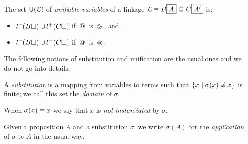 \begin{definition}
\end{definition}


\begin{definition}\label{def:uvars}
  The set $\mathsf{U}(\mathcal{L})$ of {\em unifiable variables} of a linkage
  $\mathcal{L} \equiv B\fbox{$A$}\operatorname{\,@\,} C\fbox{$A'$}$ is:
  \begin{itemize}
  \item $l^-(B\square)\cup l^+(C\square)$ if $\operatorname{\,@\,}$ is $\operatorname{\,\varogreaterthan\,}$, and
  \item $l^-(B\square)\cup l^-(C\square)$ if $\operatorname{\,@\,}$ is $\operatorname{\,\varoast\,}$.
  \end{itemize}
\end{definition}

The following notions of substitution and unification are the usual ones and we
do not go into details:
 
\begin{definition}[Substitution]
  A \emph{substitution} is a mapping from variables to terms such that $\{x ~|~
  \sigma(x)\not\equiv x\}$ is finite; we call this set the {\em domain} of $\sigma$.

  When $\sigma(x)\equiv x$ we say that $x$ is  {\em not instantiated} by
  $\sigma$.
  
  
  Given a proposition $A$ and a substitution $\sigma$, we write
  $\sigma(A)$ for the \emph{application} of $\sigma$ to $A$ in the usual way.
\end{definition}

